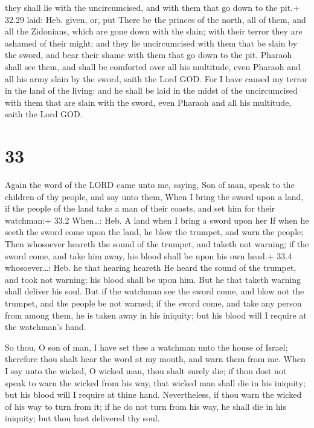 they shall lie with the uncircumcised, and with them that go down to the
pit.+ 32.29 laid: Heb. given, or, put  There be the princes
of the north, all of them, and all the Zidonians, which are gone down
with the slain; with their terror they are ashamed of their might; and
they lie uncircumcised with them that be slain by the sword, and bear
their shame with them that go down to the pit.  Pharaoh
shall see them, and shall be comforted over all his multitude, even
Pharaoh and all his army slain by the sword, saith the Lord GOD.
 For I have caused my terror in the land of the living: and
he shall be laid in the midst of the uncircumcised with them that are
slain with the sword, even Pharaoh and all his multitude, saith the Lord
GOD.

\hypertarget{section-32}{%
\section{33}\label{section-32}}

 Again the word of the LORD came unto me, saying,
 Son of man, speak to the children of thy people, and say
unto them, When I bring the sword upon a land, if the people of the land
take a man of their coasts, and set him for their watchman:+ 33.2
When\ldots: Heb. A land when I bring a sword upon her  If
when he seeth the sword come upon the land, he blow the trumpet, and
warn the people;  Then whosoever heareth the sound of the
trumpet, and taketh not warning; if the sword come, and take him away,
his blood shall be upon his own head.+ 33.4 whosoever\ldots: Heb. he
that hearing heareth  He heard the sound of the trumpet, and
took not warning; his blood shall be upon him. But he that taketh
warning shall deliver his soul.  But if the watchman see the
sword come, and blow not the trumpet, and the people be not warned; if
the sword come, and take any person from among them, he is taken away in
his iniquity; but his blood will I require at the watchman's hand.

 So thou, O son of man, I have set thee a watchman unto
the house of Israel; therefore thou shalt hear the word at my mouth, and
warn them from me.  When I say unto the wicked, O wicked
man, thou shalt surely die; if thou dost not speak to warn the wicked
from his way, that wicked man shall die in his iniquity; but his blood
will I require at thine hand.  Nevertheless, if thou warn
the wicked of his way to turn from it; if he do not turn from his way,
he shall die in his iniquity; but thou hast delivered thy soul.

